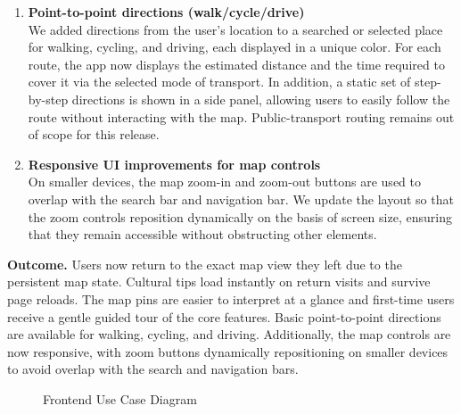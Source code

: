 \begin{enumerate}
    \item \textbf{Point-to-point directions (walk/cycle/drive)} \\
    We added directions from the user’s location to a searched or selected place for walking, cycling, and driving, each displayed in a unique color. For each route, the app now displays the estimated distance and the time required to cover it via the selected mode of transport. In addition, a static set of step-by-step directions is shown in a side panel, allowing users to easily follow the route without interacting with the map. Public-transport routing remains out of scope for this release.

    \item \textbf{Responsive UI improvements for map controls} \\
    On smaller devices, the map zoom-in and zoom-out buttons are used to overlap with the search bar and navigation bar. We update the layout so that the zoom controls reposition dynamically on the basis of screen size, ensuring that they remain accessible without obstructing other elements.
\end{enumerate}

\noindent\textbf{Outcome.} Users now return to the exact map view they left due to the persistent map state. Cultural tips load instantly on return visits and survive page reloads. The map pins are easier to interpret at a glance and first-time users receive a gentle guided tour of the core features. Basic point-to-point directions are available for walking, cycling, and driving. Additionally, the map controls are now responsive, with zoom buttons dynamically repositioning on smaller devices to avoid overlap with the search and navigation bars.

\begin{figure}[H]
    \centering
    \caption{Frontend Use Case Diagram}
    \label{fig:frontend_usecase}
\end{figure}

